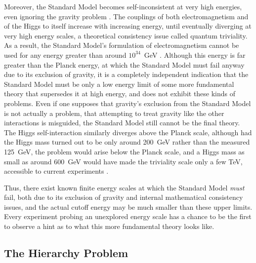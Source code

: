   Moreover, the Standard Model becomes self-inconsistent at very high energies, even ignoring the gravity problem \cite{landaupole,higgstriviality}.
  The couplings of both electromagnetism and of the Higgs to itself increase with increasing energy, until eventually diverging at very high energy scales, a theoretical consistency issue called quantum triviality.
  As a result, the Standard Model's formulation of electromagnetism cannot be used for any energy greater than around $10^{34}$~GeV \cite{laundaupole}.
  Although this energy is far greater than the Planck energy, at which the Standard Model must fail anyway due to its exclusion of gravity, it is a completely independent indication that the Standard Model must be only a low energy limit of some more fundamental theory that supersedes it at high energy, and does not exhibit these kinds of problems.
  Even if one supposes that gravity's exclusion from the Standard Model is not actually a problem, that attempting to treat gravity like the other interactions is misguided, the Standard Model still cannot be the final theory.
  The Higgs self-interaction similarly diverges above the Planck scale, although had the Higgs mass turned out to be only around 200~GeV rather than the measured 125~GeV, the problem would arise below the Planck scale, and a Higgs mass as small as around 600~GeV would have made the triviality scale only a few TeV, accessible to current experiments \cite{higgstriviality}.

  Thus, there exist known finite energy scales at which the Standard Model {\it must} fail, both due to its exclusion of gravity and internal mathematical consistency issues, and the actual cutoff energy may be much smaller than these upper limits.
  Every experiment probing an unexplored energy scale has a chance to be the first to observe a hint as to what this more fundamental theory looks like.

  \subsection{The Hierarchy Problem} \label{sec:hierarchy}

